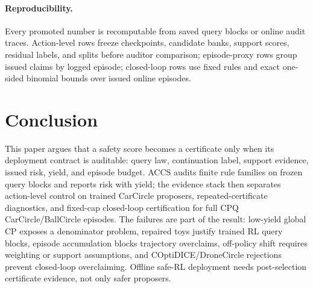\documentclass[letterpaper]{article}
\begin{document}
\paragraph{Reproducibility.}
Every promoted number is recomputable from saved query blocks or online audit
traces. Action-level rows freeze checkpoints, candidate banks, support scores,
residual labels, and splits before auditor comparison; episode-proxy rows group
issued claims by logged episode; closed-loop rows use fixed rules and exact
one-sided binomial bounds over issued online episodes.

\section{Conclusion}

This paper argues that a safety score becomes a certificate only when its
deployment contract is auditable: query law, continuation label, support
evidence, issued risk, yield, and episode budget. ACCS audits finite rule
families on frozen query blocks and reports risk with yield; the evidence stack
then separates action-level control on trained CarCircle proposers,
repeated-certificate diagnostics, and fixed-cap closed-loop certification for
full CPQ CarCircle/BallCircle episodes. The failures are part of the result:
low-yield global CP exposes a denominator problem, repaired toys justify trained
RL query blocks, episode accumulation blocks trajectory overclaims, off-policy
shift requires weighting or support assumptions, and COptiDICE/DroneCircle
rejections prevent closed-loop overclaiming. Offline safe-RL deployment needs
post-selection certificate evidence, not only safer proposers.

\clearpage


\end{document}
